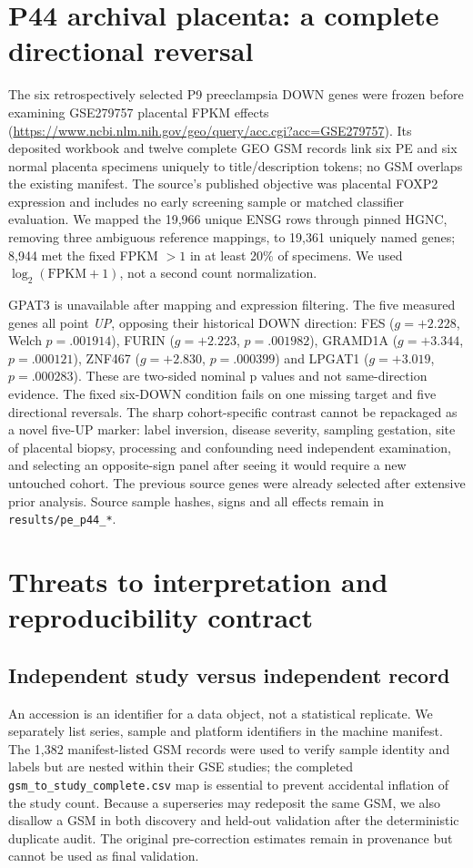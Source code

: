 \documentclass[11pt,a4paper]{article}
\begin{document}
\section{P44 archival placenta: a complete directional reversal}
The six retrospectively selected P9 preeclampsia DOWN genes were frozen before examining GSE279757 placental FPKM effects (\url{https://www.ncbi.nlm.nih.gov/geo/query/acc.cgi?acc=GSE279757}). Its deposited workbook and twelve complete GEO GSM records link six PE and six normal placenta specimens uniquely to title/description tokens; no GSM overlaps the existing manifest. The source's published objective was placental FOXP2 expression and includes no early screening sample or matched classifier evaluation. We mapped the 19,966 unique ENSG rows through pinned HGNC, removing three ambiguous reference mappings, to 19,361 uniquely named genes; 8,944 met the fixed FPKM $>1$ in at least 20\% of specimens. We used $\log_2(\mathrm{FPKM}+1)$, not a second count normalization.

GPAT3 is unavailable after mapping and expression filtering. The five measured genes all point \emph{UP}, opposing their historical DOWN direction: FES ($g=+2.228$, Welch $p=.001914$), FURIN ($g=+2.223$, $p=.001982$), GRAMD1A ($g=+3.344$, $p=.000121$), ZNF467 ($g=+2.830$, $p=.000399$) and LPGAT1 ($g=+3.019$, $p=.000283$). These are two-sided nominal p values and not same-direction evidence. The fixed six-DOWN condition fails on one missing target and five directional reversals. The sharp cohort-specific contrast cannot be repackaged as a novel five-UP marker: label inversion, disease severity, sampling gestation, site of placental biopsy, processing and confounding need independent examination, and selecting an opposite-sign panel after seeing it would require a new untouched cohort. The previous source genes were already selected after extensive prior analysis. Source sample hashes, signs and all effects remain in \texttt{results/pe\_p44\_*}.

\section{Threats to interpretation and reproducibility contract}
\subsection{Independent study versus independent record}
An accession is an identifier for a data object, not a statistical replicate. We separately list series, sample and platform identifiers in the machine manifest. The 1,382 manifest-listed GSM records were used to verify sample identity and labels but are nested within their GSE studies; the completed \texttt{gsm\_to\_study\_complete.csv} map is essential to prevent accidental inflation of the study count. Because a superseries may redeposit the same GSM, we also disallow a GSM in both discovery and held-out validation after the deterministic duplicate audit. The original pre-correction estimates remain in provenance but cannot be used as final validation.
\end{document}

